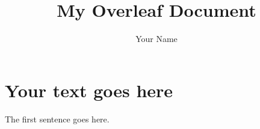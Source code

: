 \documentclass[12pt]{article}
\begin{document}
 

\title{My Overleaf Document}
\author{Your Name}
\date{}

\maketitle

\section*{Your text goes here}
The first sentence goes here.

\end{document}
